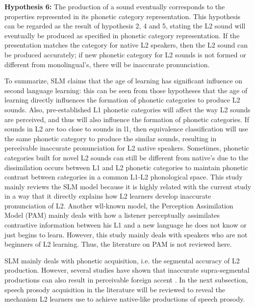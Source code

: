 \textbf{Hypothesis 6:} The production of a sound eventually corresponds to the properties represented in its phonetic category representation. This hypothesis can be regarded as the result of hypothesis 2, 4 and 5, stating the L2 sound will eventually be produced as specified in phonetic category representation. If the presentation matches the category for native L2 speakers, then the L2 sound can be produced accurately; if new phonetic category for L2 sounds is not formed or different from monolingual's, there will be inaccurate pronunciation.

To summarize, SLM claims that the age of learning has significant influence on second language learning: this can be seen from those hypotheses that the age of learning directly influences the formation of phonetic categories to produce L2 sounds. Also, pre-established L1 phonetic categories will affect the way L2 sounds are perceived, and thus will also influence the formation of phonetic categories. If sounds in L2 are too close to sounds in l1, then equivalence classification will use the same phonetic category to produce the similar sounds, resulting in perceivable inaccurate pronunciation for L2 native speakers. Sometimes, phonetic categories built for novel L2 sounds can still be different from native's due to the dissimilation occurs between L1 and L2 phonetic categories to maintain phonetic contrast between categories in a common L1-L2 phonological space. This study mainly reviews the SLM model because it is highly related with the current study in a way that it directly explains how L2 learners develop inaccurate pronunciation of L2. Another wll-known model, the Perception Assimilation Model (PAM) \citep{best1995chapter,best2007nonnative} mainly deals with how a listener perceptually assimilates contrastive information between his L1 and a new language he does not know or just begins to learn. However, this study mainly deals with speakers who are not beginners of L2 learning. Thus, the literature on PAM is not reviewed here.

SLM mainly deals with phonetic acquisition, i.e. the segmental accuracy of L2 production. However, several studies have shown that inaccurate supra-segmental productions can also result in perceivable foreign accent \citep{rognoni2013testing,winters2013perceived}. In the next subsection, speech prosody acquisition in the literature will be reviewed to reveal the mechanism L2 learners use to achieve native-like productions of speech prosody.



